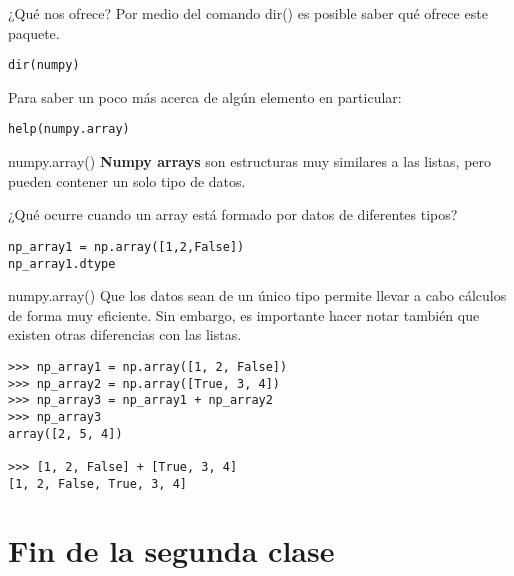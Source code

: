 \documentclass[10pt]{beamer}
\begin{document}
\begin{frame}[fragile]{¿Qué nos ofrece?}
Por medio del comando \alert{dir()} es posible saber qué ofrece este paquete.
\begin{verbatim}
dir(numpy) 
\end{verbatim}
Para saber un poco más acerca de algún elemento en particular:
\begin{verbatim}
help(numpy.array)
\end{verbatim}
\end{frame}

\begin{frame}[fragile]{numpy.array()}
	\textbf{Numpy arrays} son estructuras muy similares a las listas, pero pueden contener un solo tipo de datos.
	\begin{center}
		¿Qué ocurre cuando un array está formado por datos de diferentes tipos?
	\end{center}
	\begin{verbatim}
np_array1 = np.array([1,2,False])
np_array1.dtype 
	\end{verbatim}
	
\end{frame}

\begin{frame}[fragile]{numpy.array()}
	Que los datos sean de un único tipo permite llevar a cabo cálculos de forma muy eficiente. Sin embargo, es importante hacer notar también que existen otras diferencias con las listas. 
	
	\begin{verbatim}
>>> np_array1 = np.array([1, 2, False])
>>> np_array2 = np.array([True, 3, 4])
>>> np_array3 = np_array1 + np_array2
>>> np_array3
array([2, 5, 4])

>>> [1, 2, False] + [True, 3, 4]
[1, 2, False, True, 3, 4]
	\end{verbatim}
\end{frame}

\section{Fin de la segunda clase}
\end{document}
